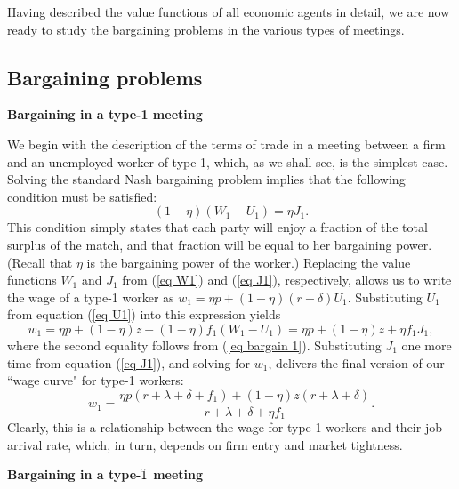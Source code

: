 \documentclass[12pt]{article} %
\theoremstyle{definition}
\begin{document}
Having described the value functions of all economic agents in detail, we are now ready to study the bargaining problems in the various types of meetings. 


\subsection{Bargaining problems}\label{section bargaining} 

\textbf{Bargaining in a type-1 meeting}

\medskip 

\noindent We begin with the description of the terms of trade in a meeting between a firm and an unemployed worker of type-1, which, as we shall see, is the simplest case. Solving the standard Nash bargaining problem implies that the following condition must be satisfied:
\begin{equation}
(1-\eta)(W_1-U_1) = \eta J_1. \label{eq bargain 1}
\end{equation}
This condition simply states that each party will enjoy a fraction of the total surplus of the match, and that fraction will be equal to her bargaining power. (Recall that $\eta$ is the bargaining power of the worker.) Replacing the value functions $W_1$ and $J_1$ from (\ref{eq W1}) and (\ref{eq J1}), respectively, allows us to write the wage of a type-1 worker as $w_1 = \eta p + (1-\eta)(r+\delta)U_1$. Substituting $U_1$ from equation (\ref{eq U1}) into this expression yields  
$$
w_1= \eta p + (1-\eta)z + (1-\eta)f_1(W_1-U_1)=  \eta p + (1-\eta)z + \eta f_1 J_1, 
$$where the second equality follows from (\ref{eq bargain 1}). Substituting $J_1$ one more time from equation (\ref{eq J1}), and solving for $w_1$, delivers the final version of our ``wage curve" for type-1 workers:  
\begin{equation}
 w_1 = \frac{\eta p (r+\lambda+\delta+f_1)+(1-\eta)z(r+\lambda+\delta)}{r+\lambda+\delta + \eta f_1}. \label{eq WC 1}
\end{equation}Clearly, this is a relationship between the wage for type-1 workers and their job arrival rate, which, in turn, depends on firm entry and market tightness. 

\bigskip 


\noindent \textbf{Bargaining in a type-$\Tilde{1}$ meeting}

\medskip 
\end{document}
